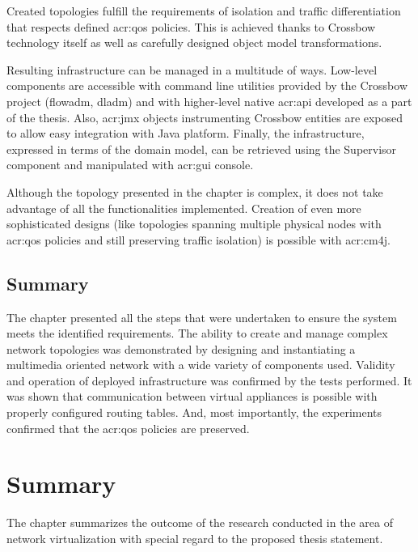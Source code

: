\documentclass[11pt,openany]{book}
\begin{document}
      Created topologies fulfill the requirements of isolation and traffic differentiation that respects defined
      \gls{acr:qos} policies. This is achieved thanks to Crossbow technology itself as well as carefully designed object
      model transformations.

      Resulting infrastructure can be managed in a multitude of ways. Low-level components are accessible with command
      line utilities provided by the Crossbow project (flowadm, dladm) and with higher-level native \gls{acr:api}
      developed as a part of the thesis. Also, \gls{acr:jmx} objects instrumenting Crossbow entities are exposed to
      allow easy integration with Java platform. Finally, the infrastructure, expressed in terms of the domain model,
      can be retrieved using the Supervisor component and manipulated with \gls{acr:gui} console.

      Although the topology presented in the chapter is complex, it does not take advantage of all the functionalities
      implemented. Creation of even more sophisticated designs (like topologies spanning multiple physical nodes with
      \gls{acr:qos} policies and still preserving traffic isolation) is possible with \gls{acr:cm4j}.


    \section*{Summary}

      The chapter presented all the steps that were undertaken to ensure the system meets the identified requirements.
      The ability to create and manage complex network topologies was demonstrated by designing and instantiating
      a multimedia oriented network with a wide variety of components used. Validity and operation of deployed
      infrastructure was confirmed by the tests performed. It was shown that communication between virtual appliances is
      possible with properly configured routing tables. And, most importantly, the experiments confirmed that
      the \gls{acr:qos} policies are preserved.


  \chapter{Summary}
  \label{chap:sum}

	  The chapter summarizes the outcome of the research conducted in the area of network virtualization with special regard to 
	  the proposed thesis statement.
	
\end{document}
